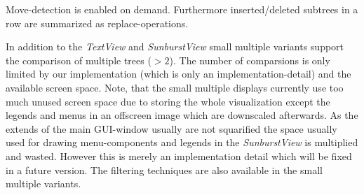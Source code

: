 Move-detection is enabled on demand. Furthermore inserted/deleted subtrees in a row are summarized as replace-operations.

In addition to the \emph{TextView} and \emph{SunburstView} small multiple variants support the comparison of multiple trees ($>2$). The number of comparsions is only limited by our implementation (which is only an implementation-detail) and the available screen space. Note, that the small multiple displays currently use too much unused screen space due to storing the whole visualization except the legends and menus in an offscreen image which are downscaled afterwards. As the extends of the main GUI-window usually are not squarified the space usually used for drawing menu-components and legends in the \emph{SunburstView} is multiplied and wasted. However this is merely an implementation detail which will be fixed in a future version. The filtering techniques are also available in the small multiple variants.
